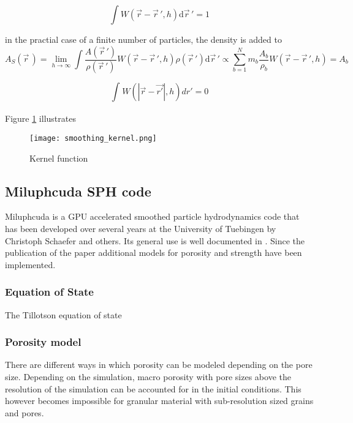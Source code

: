 \begin{equation} \label{eq:kernel_normalization}
    \int W(\vec{r} - \vec{r}\,', h)\mathrm d\vec{r}\,' = 1
\end{equation}

in the practial case of a finite number of particles, the density is added to
\begin{equation}
    {\displaystyle A_{S}({\vec {r}}\,)=\lim \limits _{h\rightarrow \infty }\int {\frac {A({\vec {r}}\,')}{\rho ({\vec {r}}\,')}}W({\vec {r}}-{\vec {r}}\,',h)\rho ({\vec {r}}\,')\mathrm {d} {\vec {r}}\,'\propto \sum \limits _{b=1}^{N}m_{b}{\frac {A_{b}}{\rho _{b}}}W({\vec {r}}-{\vec {r}}\,',h)=A_{b}}
\end{equation}




\begin{equation}
    \int_{}^{} W(|\vec{r} - \vec{r'}|, h)dr' = 0
\end{equation}


Figure \ref{fig:smoothing_kernel} illustrates

\begin{figure}[H]
    \centering
    \texttt{[image: smoothing\_kernel.png]}
    \caption{Kernel function \cite{wiki:smoothing_kernel}}
    \label{fig:smoothing_kernel}
\end{figure}

\subsection{Miluphcuda SPH code}
Miluphcuda is a GPU accelerated smoothed particle hydrodynamics code that has been developed over several years at the University of Tuebingen by Christoph Schaefer and others. Its general use is well documented in \cite{Schaefer_2016}. Since the publication of the paper additional models for porosity and strength have been implemented.


\subsubsection{Equation of State}
The Tillotson equation of state \cite{Tillotson_1962}


\subsubsection{Porosity model}
There are different ways in which porosity can be modeled depending on the pore size. Depending on the simulation, macro porosity with pore sizes above the resolution of the simulation can be accounted for in the initial conditions. This however becomes impossible for granular material with sub-resolution sized grains and pores.

